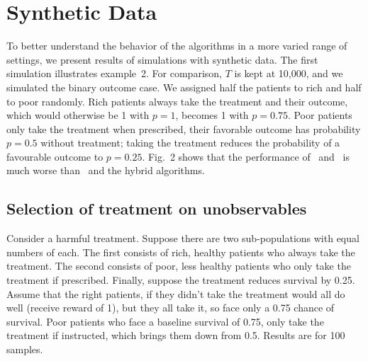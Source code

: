 \section{Synthetic Data}


To better understand the behavior of the algorithms in a more varied range of settings, we present results of simulations with synthetic data.
The first simulation illustrates example~2. For comparison, $T$ is kept at 10,000, and we simulated the binary outcome case. We assigned half the patients to rich and half to poor randomly. Rich patients always take the treatment and their outcome, which would otherwise be 1 with $p=1$, becomes 1 with  $p=0.75$. Poor patients only take the treatment when prescribed, their favorable outcome has probability $p=0.5$ without treatment; taking the treatment reduces the probability of a favourable outcome to $p=0.25$. Fig.~2 shows that the performance of \actual\, and \comply\, is much worse than \chosen\, and the hybrid algorithms.



\subsection{Selection of treatment on unobservables}

Consider a harmful treatment. Suppose there are two sub-populations with equal numbers of each. The first consists of rich, healthy patients who always take the treatment. The second consists of poor, less healthy patients who only take the treatment if prescribed. Finally, suppose the treatment reduces survival by 0.25. Assume that the right patients, if they didn't take the treatment would all do well (receive reward of 1), but they all take it, so face only a 0.75 chance of survival. Poor patients who face a baseline survival of 0.75, only take the treatment if instructed, which brings them down from 0.5. Results are for 100 samples.

%

%


